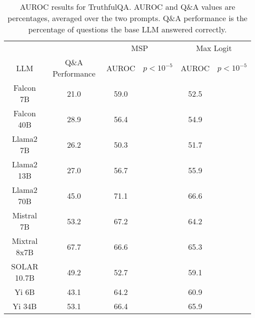 \begin{table*}
\centering
\begin{tabular}{c|c|c|c|c|c}
& & \multicolumn{2}{c|}{MSP} & \multicolumn{2}{c}{Max Logit} \\ 
LLM & Q\&A Performance & AUROC & $p < 10^{-5}$ & AUROC & $p < 10^{-5}$\\ \hline
Falcon 7B & 21.0 & 59.0 &  & 52.5 & \\
Falcon 40B & 28.9 & 56.4 &  & 54.9 & \\
Llama2 7B & 26.2 & 50.3 &  & 51.7 & \\
Llama2 13B & 27.0 & 56.7 &  & 55.9 & \\
Llama2 70B & 45.0 & 71.1 &  & 66.6 & \\
Mistral 7B & 53.2 & 67.2 &  & 64.2 & \\
Mixtral 8x7B & 67.7 & 66.6 &  & 65.3 & \\
SOLAR 10.7B & 49.2 & 52.7 &  & 59.1 & \\
Yi 6B & 43.1 & 64.2 &  & 60.9 & \\
Yi 34B & 53.1 & 66.4 &  & 65.9 & \\
\hline
\end{tabular}
\caption{AUROC results for TruthfulQA. AUROC and Q\&A values are percentages, averaged over the two prompts. Q\&A performance is the percentage of questions the base LLM answered correctly.}
\label{tab:truthfulqa_auroc}
\end{table*}
